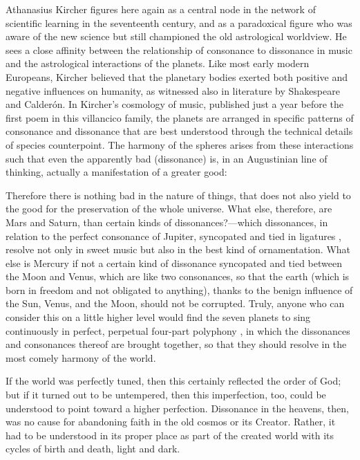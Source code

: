 Athanasius Kircher figures here again as a central node in the network of
scientific learning in the seventeenth century, and as a paradoxical figure who
was aware of the new science but still championed the old astrological
worldview.
He sees a close affinity between the relationship of consonance to dissonance
in music and the astrological interactions of the planets.
Like most early modern Europeans, Kircher believed that the planetary bodies
exerted both positive and negative influences on humanity, as witnessed also
in literature by Shakespeare and Calderón.
In Kircher's cosmology of music, published just a year before the first poem in
this villancico family, the planets are arranged in specific patterns of
consonance and dissonance that are best understood through the technical
details of species counterpoint.
The harmony of the spheres arises from these interactions such that even the
apparently bad (dissonance) is, in an Augustinian line of thinking, actually a
manifestation of a greater good:
\begin{quoting}
	Therefore there is nothing bad in the nature of things, that does not
	also yield to the good for the preservation of the whole universe.
	What else, therefore, are Mars and Saturn, than certain kinds of
        dissonances?---which dissonances, in relation to the perfect consonance
        of Jupiter, syncopated and tied in ligatures , resolve
        not only in sweet music but also in the best kind of ornamentation.
	What else is Mercury if not a certain kind of dissonance syncopated and
	tied between the Moon and Venus, which are like two consonances, so that
	the earth (which is born in freedom and not obligated to anything),
	thanks to the benign influence of the Sun, Venus, and the Moon, should
	not be corrupted.
	Truly, anyone who can consider this on a little higher level would find
	the seven planets to sing continuously in perfect, perpetual four-part
	polyphony , in which the dissonances and
	consonances thereof are brought together, so that they should resolve in
	the most comely harmony of the world.%
        \Autocite[, 383--384]{Kircher:Musurgia}
\end{quoting}
If the world was perfectly tuned, then this certainly reflected the order of
God; but if it turned out to be untempered, then this imperfection, too, could
be understood to point toward a higher perfection.  
Dissonance in the heavens, then, was no cause for abandoning faith in the old
cosmos or its Creator.  
Rather, it had to be understood in its proper place as part of the created
world with its cycles of birth and death, light and dark.

